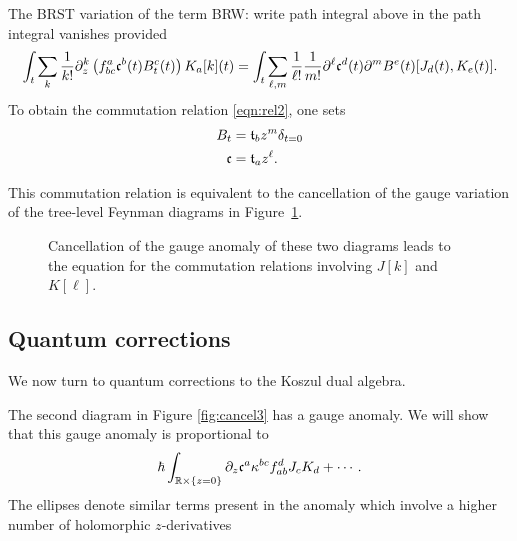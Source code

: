 \documentclass[11pt]{amsart}
\def\brian#1{{\textcolor{blue!65!red}{BRW: {#1}}}}
\begin{document}
The BRST variation of the term \brian{write path integral above} in the path integral vanishes provided
\[
\int_t \sum_k \frac1{k!} \partial_z^k \left(f_{bc}^a \mathfrak c^b(t) B^c_t (t) \right) K_a[k] (t) = \int_t \sum_{\ell,m} \frac1{\ell!} \frac1{m!} \partial^\ell \mathfrak c^d (t) \partial^m B^e (t) [J_d (t), K_e(t)]  .
\] 
To obtain the commutation relation \eqref{eqn:rel2}, one sets 
\begin{align*}
B_t & = \mathfrak t_b z^{m} \delta_{t=0} \\
\mathfrak c & = \mathfrak t_a z^\ell .
\end{align*}

This commutation relation is equivalent to the cancellation of the gauge variation of the tree-level Feynman diagrams in Figure~\ref{fig:cancel2}.

\begin{figure}
	\caption{Cancellation of the gauge anomaly of these two diagrams leads to the equation for the commutation relations involving $J[k]$ and $K[\ell]$.
	\label{fig:cancel2}}
\end{figure}

\subsection*{Quantum corrections}

We now turn to quantum corrections to the Koszul dual algebra.

The second diagram in Figure \ref{fig:cancel3} has a gauge anomaly.
We will show that this gauge anomaly is proportional to 
\[
\hbar \int_{\mathbb R \times \{z=0\}} \partial_z \mathfrak c^a \kappa^{bc} f_{ab}^d J_{c} K_{d} + \cdots .
\]
The ellipses denote similar terms present in the anomaly which involve a higher number of holomorphic $z$-derivatives 
\end{document}
